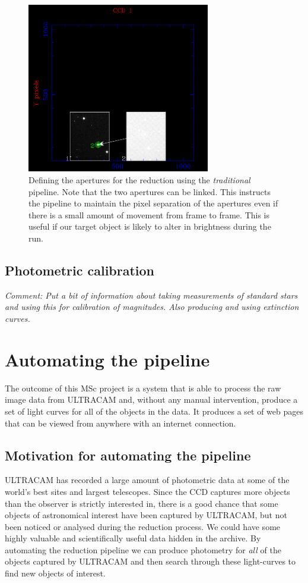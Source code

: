 \begin{figure}[!h]
\centering
\includegraphics[width=80mm]{images/setaper.png}
\caption{Defining the apertures for the reduction using the \emph{traditional} pipeline. Note that the two apertures can be linked. This instructs the pipeline to maintain the pixel separation of the apertures even if there is a small amount of movement from frame to frame. This is useful if our target object is likely to alter in brightness during the run. }
\label{fig:settingapertures}
\end{figure}

\subsection{Photometric calibration}
\emph{Comment: Put a bit of information about taking measurements of standard stars and using this for calibration of magnitudes. Also producing and using extinction curves.}

\section{Automating the pipeline}
The outcome of this MSc project is a system that is able to process the raw image data from ULTRACAM and, without any manual intervention, produce a set of light curves for all of the objects in the data. It produces a set of web pages that can be viewed from anywhere with an internet connection. 

\subsection{Motivation for automating the pipeline}
ULTRACAM has recorded a large amount of photometric data at some of the world's best sites and largest telescopes. Since the CCD captures more objects than the observer is strictly interested in, there is a good chance that some objects of astronomical interest have been captured by ULTRACAM, but not been noticed or analysed during the reduction process. We could have some highly valuable and scientifically useful data hidden in the archive. By automating the reduction pipeline we can produce photometry for \emph{all} of the objects captured by ULTRACAM and then search through these light-curves to find new objects of interest. 

